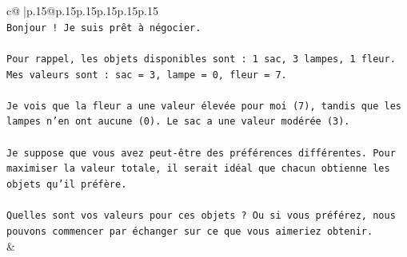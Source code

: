 \documentclass{article}
\begin{document}
{\begin{supertabular}{c@{$\;$}|p{.15\linewidth}@{}p{.15\linewidth}p{.15\linewidth}p{.15\linewidth}p{.15\linewidth}p{.15\linewidth}}
{{{\\ 
\texttt{Bonjour ! Je suis prêt à négocier.} \\
\\ 
\texttt{Pour rappel, les objets disponibles sont : 1 sac, 3 lampes, 1 fleur.} \\
\texttt{Mes valeurs sont : sac = 3, lampe = 0, fleur = 7.} \\
\\ 
\texttt{Je vois que la fleur a une valeur élevée pour moi (7), tandis que les lampes n'en ont aucune (0). Le sac a une valeur modérée (3).} \\
\\ 
\texttt{Je suppose que vous avez peut{-}être des préférences différentes. Pour maximiser la valeur totale, il serait idéal que chacun obtienne les objets qu'il préfère.} \\
\\ 
\texttt{Quelles sont vos valeurs pour ces objets ? Ou si vous préférez, nous pouvons commencer par échanger sur ce que vous aimeriez obtenir.} \\
            }
        }
    }
    & \\ \\


\end{supertabular}}
\end{document}
